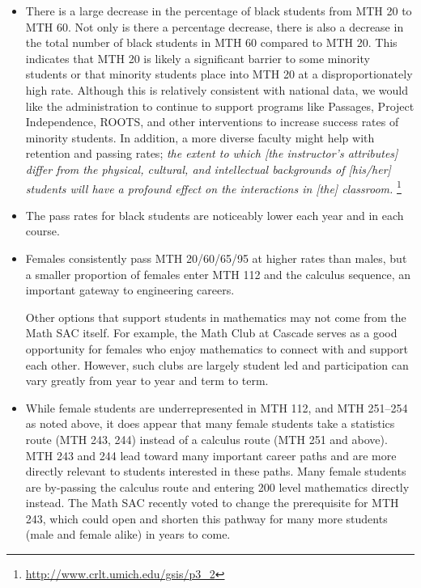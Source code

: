 \begin{itemize}
	\item There is a large decrease in the percentage of black students from
	      MTH 20 to MTH 60.
	      Not only is there a percentage decrease, there is also a decrease in the total number of black students in MTH 60 compared to MTH 20.
	      This indicates that MTH 20 is likely a significant barrier to some minority students or that minority students place into MTH 20 at a disproportionately high rate.
	      Although this is relatively consistent with national data, we would like the administration to continue to support programs like Passages, Project Independence, ROOTS, and other interventions to increase success rates of minority students.
	      In addition, a more diverse faculty might help with retention and passing rates; \emph{ the extent to which [the instructor's attributes] differ from the physical, cultural, and intellectual backgrounds of [his/her] students will have a profound effect on the interactions in [the] classroom.
	      }\footnote{\url{http://www.crlt.umich.edu/gsis/p3_2}}
	\item The pass rates for black students are noticeably lower each year and
	      in each course.

	\item Females consistently pass MTH 20/60/65/95 at higher rates than males,
	      but a smaller proportion of females enter MTH 112 and the calculus
	      sequence, an important gateway to engineering careers.


	      Other options that support students in mathematics may not come from the Math SAC itself.
	      For example, the Math Club at Cascade serves as a good opportunity for females who enjoy mathematics to connect with and support each other.
	      However, such clubs are largely student led and participation can vary greatly from year to year and term to term.

	\item While female students are underrepresented in MTH 112, and MTH 251--254
	      as noted above, it does appear that many female students take a statistics
	      route (MTH 243, 244) instead of a calculus route (MTH 251 and above).
	      MTH 243 and 244 lead toward many important career paths and are more directly relevant to students interested in these paths.
	      Many female students are by-passing the calculus route and entering 200 level mathematics directly instead.
	      The Math SAC recently voted to change the prerequisite for MTH 243, which could open and shorten this pathway for many more students (male and female alike) in years to come.


\end{itemize}
